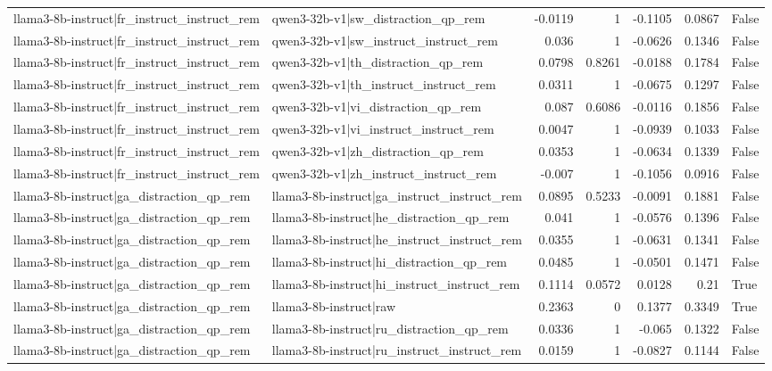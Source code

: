 \begin{table}
\begin{tabular}{l l r r r r l}
llama3-8b-instruct|fr_instruct_instruct_rem & qwen3-32b-v1|sw_distraction_qp_rem & -0.0119 & 1 & -0.1105 & 0.0867 & False \\
llama3-8b-instruct|fr_instruct_instruct_rem & qwen3-32b-v1|sw_instruct_instruct_rem & 0.036 & 1 & -0.0626 & 0.1346 & False \\
llama3-8b-instruct|fr_instruct_instruct_rem & qwen3-32b-v1|th_distraction_qp_rem & 0.0798 & 0.8261 & -0.0188 & 0.1784 & False \\
llama3-8b-instruct|fr_instruct_instruct_rem & qwen3-32b-v1|th_instruct_instruct_rem & 0.0311 & 1 & -0.0675 & 0.1297 & False \\
llama3-8b-instruct|fr_instruct_instruct_rem & qwen3-32b-v1|vi_distraction_qp_rem & 0.087 & 0.6086 & -0.0116 & 0.1856 & False \\
llama3-8b-instruct|fr_instruct_instruct_rem & qwen3-32b-v1|vi_instruct_instruct_rem & 0.0047 & 1 & -0.0939 & 0.1033 & False \\
llama3-8b-instruct|fr_instruct_instruct_rem & qwen3-32b-v1|zh_distraction_qp_rem & 0.0353 & 1 & -0.0634 & 0.1339 & False \\
llama3-8b-instruct|fr_instruct_instruct_rem & qwen3-32b-v1|zh_instruct_instruct_rem & -0.007 & 1 & -0.1056 & 0.0916 & False \\
llama3-8b-instruct|ga_distraction_qp_rem & llama3-8b-instruct|ga_instruct_instruct_rem & 0.0895 & 0.5233 & -0.0091 & 0.1881 & False \\
llama3-8b-instruct|ga_distraction_qp_rem & llama3-8b-instruct|he_distraction_qp_rem & 0.041 & 1 & -0.0576 & 0.1396 & False \\
llama3-8b-instruct|ga_distraction_qp_rem & llama3-8b-instruct|he_instruct_instruct_rem & 0.0355 & 1 & -0.0631 & 0.1341 & False \\
llama3-8b-instruct|ga_distraction_qp_rem & llama3-8b-instruct|hi_distraction_qp_rem & 0.0485 & 1 & -0.0501 & 0.1471 & False \\
llama3-8b-instruct|ga_distraction_qp_rem & llama3-8b-instruct|hi_instruct_instruct_rem & 0.1114 & 0.0572 & 0.0128 & 0.21 & True \\
llama3-8b-instruct|ga_distraction_qp_rem & llama3-8b-instruct|raw & 0.2363 & 0 & 0.1377 & 0.3349 & True \\
llama3-8b-instruct|ga_distraction_qp_rem & llama3-8b-instruct|ru_distraction_qp_rem & 0.0336 & 1 & -0.065 & 0.1322 & False \\
llama3-8b-instruct|ga_distraction_qp_rem & llama3-8b-instruct|ru_instruct_instruct_rem & 0.0159 & 1 & -0.0827 & 0.1144 & False \\

\end{tabular}
\end{table}
